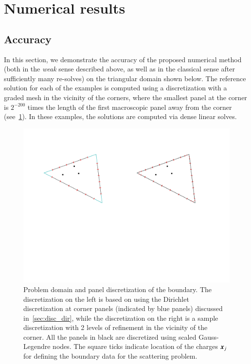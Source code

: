 
\section{Numerical results \label{sec:num}}
\subsection{Accuracy}
In this section, we demonstrate the accuracy of the proposed numerical method (both in the {\it weak} sense 
described above, 
as well as in the classical sense after sufficiently many re-solves) on the triangular domain shown below. 
The reference solution for each of the examples is computed using a discretization with
a graded mesh in the vicinity of the corners, where the smallest panel at the corner is $2^{-200}$ times
the length of the first macroscopic panel away from the corner (see~\cref{fig:dom}). In these examples, the solutions are computed via dense linear solves.

\begin{figure}
\begin{center}
\includegraphics[width=0.7\linewidth]{paper-figs/discretization}
\caption{Problem domain and panel discretization of the boundary. The discretization on the left is based on using the Dirichlet
discretization at corner panels (indicated by blue panels) discussed in~\cref{sec:disc_dir}, while the discretization on the right is a sample discretization with 2 levels of refinement in the vicinity of the corner. All the panels in black are discretized using scaled Gauss-Legendre nodes. The square ticks indicate location of the charges $\boldsymbol{x}_{j}$ for defining the boundary data for the scattering problem.}
\label{fig:dom}
\end{center}
\end{figure}

